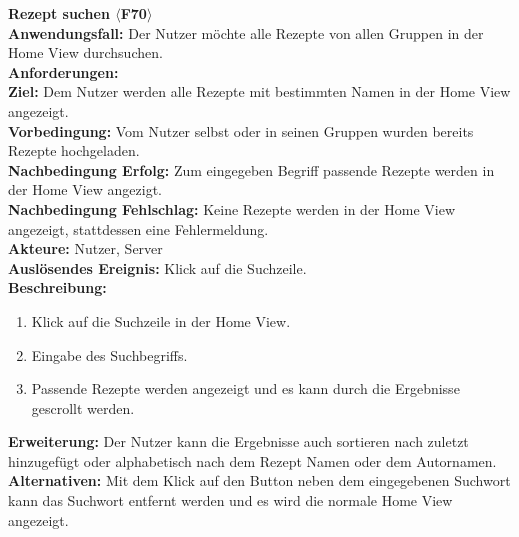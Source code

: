 \documentclass[parskip=full]{scrartcl}
\begin{document}
\textbf{Rezept suchen $\langle$F70$\rangle$}\\
\textbf{Anwendungsfall:} Der Nutzer möchte alle Rezepte von allen Gruppen in der Home View durchsuchen.\\
\textbf{Anforderungen:} \\
\textbf{Ziel:} Dem Nutzer werden alle Rezepte mit bestimmten Namen in der Home View angezeigt.\\
\textbf{Vorbedingung:} Vom Nutzer selbst oder in seinen Gruppen wurden bereits Rezepte hochgeladen.\\
\textbf{Nachbedingung Erfolg:} Zum eingegeben Begriff passende Rezepte werden in der Home View angezigt.\\
\textbf{Nachbedingung Fehlschlag:} Keine Rezepte werden in der Home View angezeigt, stattdessen eine Fehlermeldung.\\
\textbf{Akteure:} Nutzer, Server\\
\textbf{Auslösendes Ereignis:} Klick auf die Suchzeile.\\
\textbf{Beschreibung:}
\begin{enumerate}
    \item Klick auf die Suchzeile in der Home View.
    \item Eingabe des Suchbegriffs.
    \item Passende Rezepte werden angezeigt und es kann durch die Ergebnisse gescrollt werden.
\end{enumerate}
\textbf{Erweiterung:} Der Nutzer kann die Ergebnisse auch sortieren nach zuletzt hinzugefügt oder alphabetisch nach dem Rezept Namen oder dem Autornamen.\\
\textbf{Alternativen:} Mit dem Klick auf den Button neben dem eingegebenen Suchwort kann das Suchwort entfernt werden und es wird die normale Home View angezeigt.\\
\newpage
\end{document}
